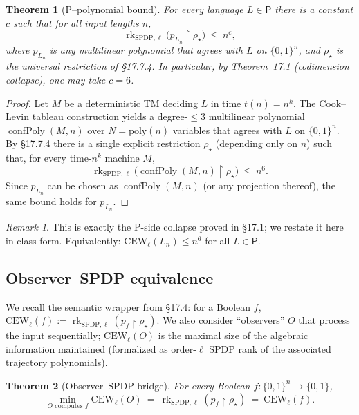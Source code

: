 \documentclass[12pt]{article}
\newtheorem{theorem}{Theorem}
\theoremstyle{definition}
\theoremstyle{definition}
\theoremstyle{remark}
\newtheorem{remark}{Remark}
\theoremstyle{remark}
\begin{document}
\begin{theorem}[P--polynomial bound]\label{thm:p-poly-bound}
For every language $L\in\mathsf{P}$ there is a constant $c$ such that for all input lengths $n$,
\[
\operatorname{rk}_{\mathrm{SPDP},\ell}\!\big(p_{L_n}\upharpoonright\rho_\star\big)\ \le\ n^c,
\]
where $p_{L_n}$ is any multilinear polynomial that agrees with $L$ on $\{0,1\}^n$, and $\rho_\star$ is the universal restriction of \S17.7.4. In particular, by Theorem~17.1 (codimension collapse), one may take $c=6$.
\end{theorem}

\begin{proof}
Let $M$ be a deterministic TM deciding $L$ in time $t(n)=n^k$. The Cook--Levin tableau construction yields a degree-$\le 3$ multilinear polynomial $\operatorname{confPoly}(M,n)$ over $N=\mathrm{poly}(n)$ variables that agrees with $L$ on $\{0,1\}^n$. By \S17.7.4 there is a single explicit restriction $\rho_\star$ (depending only on $n$) such that, for every time-$n^k$ machine $M$,
\[
\operatorname{rk}_{\mathrm{SPDP},\ell}\!\big(\operatorname{confPoly}(M,n)\upharpoonright\rho_\star\big)\ \le\ n^6.
\]
Since $p_{L_n}$ can be chosen as $\operatorname{confPoly}(M,n)$ (or any projection thereof), the same bound holds for $p_{L_n}$.
\end{proof}

\begin{remark}
This is exactly the P-side collapse proved in \S17.1; we restate it here in class form. Equivalently: $\mathrm{CEW}_\ell(L_n)\le n^6$ for all $L\in\mathsf{P}$.
\end{remark}

\subsection{Observer--SPDP equivalence}

We recall the semantic wrapper from \S17.4: for a Boolean $f$, $\mathrm{CEW}_\ell(f):=\operatorname{rk}_{\mathrm{SPDP},\ell}(p_f\upharpoonright\rho_\star)$. We also consider ``observers'' $O$ that process the input sequentially; $\mathrm{CEW}_\ell(O)$ is the maximal size of the algebraic information maintained (formalized as order-$\ell$ SPDP rank of the associated trajectory polynomials).

\begin{theorem}[Observer--SPDP bridge]\label{thm:observer-spdp-bridge}
For every Boolean $f\!:\{0,1\}^n\to\{0,1\}$,
\[
\min_{O\text{ computes }f}\mathrm{CEW}_\ell(O)\ =\ \operatorname{rk}_{\mathrm{SPDP},\ell}(p_f\upharpoonright\rho_\star)\ =\ \mathrm{CEW}_\ell(f).
\]
\end{theorem}
\end{document}
